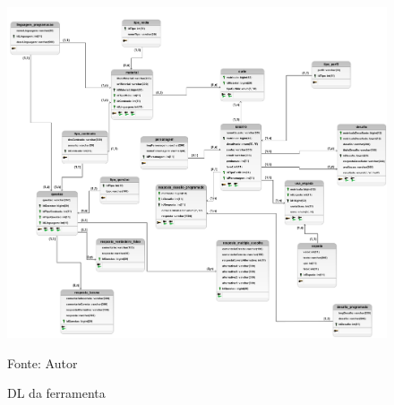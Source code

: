 \begin{figure}[h]
	\centering
	\includegraphics[keepaspectratio=true,scale=0.32]{figuras/dl.png}
	\caption{DL da ferramenta}
	Fonte: Autor
	\label{figura3}
\end{figure}





